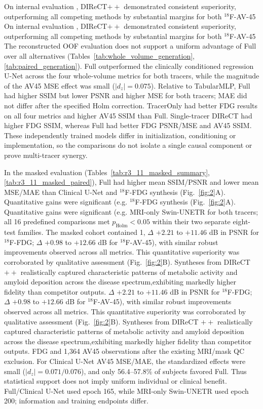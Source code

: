 \documentclass{article}
\providecommand{\DIFaddtex}[1]{{\protect\color{blue} \sf #1}} %
\providecommand{\DIFdeltex}[1]{{\protect\color{red} \ifmmode #1\else\scriptsize #1\fi}} %
\providecommand{\DIFaddbegin}{} %
\providecommand{\DIFaddend}{} %
\providecommand{\DIFdelbegin}{} %
\providecommand{\DIFdelend}{} %
\providecommand{\DIFadd}[1]{\texorpdfstring{\DIFaddtex{#1}}{#1}} %
\providecommand{\DIFdel}[1]{\texorpdfstring{\DIFdeltex{#1}}{}} %
\newcommand{\DIFscaledelfig}{0.5}
\newlength{\DIFdelgraphicswidth} %
\newlength{\DIFdelgraphicsheight} %
\newcommand{\DIFaddincludegraphics}[2][]{{\color{blue}\fbox{\DIFOincludegraphics[#1]{#2}}}} %
\newcommand{\DIFdelincludegraphics}[2][]{%
\sbox{\DIFdelgraphicsbox}{\DIFOincludegraphics[#1]{#2}}%
\settoboxwidth{\DIFdelgraphicswidth}{\DIFdelgraphicsbox} %
\settoboxtotalheight{\DIFdelgraphicsheight}{\DIFdelgraphicsbox} %
\scalebox{\DIFscaledelfig}{%
\parbox[b]{\DIFdelgraphicswidth}{\usebox{\DIFdelgraphicsbox}\\[-\baselineskip] \rule{\DIFdelgraphicswidth}{0em}}\llap{\resizebox{\DIFdelgraphicswidth}{\DIFdelgraphicsheight}{%
\setlength{\unitlength}{\DIFdelgraphicswidth}%
\begin{picture}(1,1)%
\thicklines\linethickness{2pt} %
{\color[rgb]{1,0,0}\put(0,0){\framebox(1,1){}}}%
{\color[rgb]{1,0,0}\put(0,0){\line( 1,1){1}}}%
{\color[rgb]{1,0,0}\put(0,1){\line(1,-1){1}}}%
\end{picture}%
}\hspace*{3pt}}} %
} %
\DeclareRobustCommand{\DIFaddbegin}{\DIFOaddbegin \let\includegraphics\DIFaddincludegraphics} %
\DeclareRobustCommand{\DIFaddend}{\DIFOaddend \let\includegraphics\DIFOincludegraphics} %
\DeclareRobustCommand{\DIFdelbegin}{\DIFOdelbegin \let\includegraphics\DIFdelincludegraphics} %
\DeclareRobustCommand{\DIFdelend}{\DIFOaddend \let\includegraphics\DIFOincludegraphics} %
\begin{document}
\DIFdelbegin \DIFdel{On internal evaluation , DIReCT$++$ demonstrated consistent superiority, outperforming all competing methods by substantial margins for both $^{18}$F-AV-45 }\DIFdelend \DIFaddbegin \DIFadd{The reconstructed OOF evaluation does not support a uniform advantage of Full over all alternatives (Tables~\ref{tab:whole_volume_generation},\ref{tab:paired_generation}). Full outperformed the clinically conditioned regression U-Net across the four whole-volume metrics for both tracers, while the magnitude of the AV45 MSE effect was small ($|d_z|=0.075$). Relative to TabularMLP, Full had higher SSIM but lower PSNR and higher MSE for both tracers; MAE did not differ after the specified Holm correction. TracerOnly had better FDG results on all four metrics and higher AV45 SSIM than Full. Single-tracer DIReCT had higher FDG SSIM, whereas Full had better FDG PSNR/MSE and AV45 SSIM. These independently trained models differ in initialization, conditioning or implementation, so the comparisons do not isolate a single causal component or prove multi-tracer synergy.
}

\DIFadd{In the masked evaluation (Tables~\ref{tab:r3_11_masked_summary},\ref{tab:r3_11_masked_paired}), Full had higher mean SSIM/PSNR and lower mean MSE/MAE than Clinical U-Net }\DIFaddend and \DIFdelbegin \DIFdel{$^{18}$F-FDG synthesis (Fig.~\ref{fig:2}A). Quantitative gains were significant (e.g. }\DIFdelend \DIFaddbegin \DIFadd{MRI-only Swin-UNETR for both tracers; all 16 predefined comparisons met $p_{\mathrm{Holm}}<0.05$ within their two separate eight-test families. The masked cohort contained 1}\DIFaddend ,\DIFdelbegin \DIFdel{$\Delta$ $+2.21$ to $+11.46$ dB in PSNR for $^{18}$F-FDG; $\Delta$ $+0.98$  to $+12.66$ dB for $^{18}$F-AV-45), with similar robust improvements observed across all metrics. This quantitative superiority was corroborated by qualitative assessment (Fig.~\ref{fig:2}B). Syntheses from DIReCT $++$ realistically captured characteristic patterns of metabolic activity and amyloid deposition across the disease spectrum,exhibiting markedly higher fidelity than competitor outputs. }\DIFdelend \DIFaddbegin \DIFadd{597 FDG and 1,364 AV45 observations after the existing MRI/mask QC exclusion. For Clinical U-Net AV45 MSE/MAE, the standardized effects were small ($|d_z|=0.071/0.076$), and only 56.4--57.8\% of subjects favored Full. Thus statistical support does not imply uniform individual or clinical benefit. Full/Clinical U-Net used epoch 165, while MRI-only Swin-UNETR used epoch 200; information and training endpoints differ.
}\DIFaddend 
\end{document}
